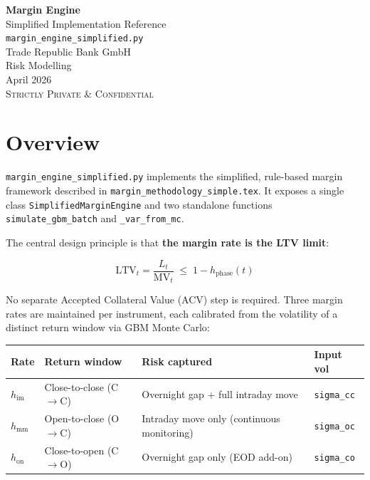\documentclass[9pt, a4paper]{extarticle}
\newenvironment{formulabox}{\par\addvspace{4pt}}{\par\addvspace{4pt}}
\begin{document}
\begin{titlepage}
\vspace*{4cm}
\begin{center}
    {\Huge\bfseries Margin Engine}\\[0.5em]
    {\Large Simplified Implementation Reference}\\[0.5em]
    {\normalsize \texttt{margin\_engine\_simplified.py}}\\[2em]
    {\large Trade Republic Bank GmbH}\\[0.5em]
    {\large Risk Modelling}\\[2em]
    {\normalsize April 2026}\\[1em]
    {\small\textsc{Strictly Private \& Confidential}}
\end{center}
\end{titlepage}

\tableofcontents
\newpage

\section{Overview}
\label{sec:overview}

\texttt{margin\_engine\_simplified.py} implements the simplified, rule-based margin
framework described in \texttt{margin\_methodology\_simple.tex}. It exposes a single
class \texttt{SimplifiedMarginEngine} and two standalone functions
\texttt{simulate\_gbm\_batch} and \texttt{\_var\_from\_mc}.

The central design principle is that \textbf{the margin rate is the LTV limit}:

\begin{formulabox}
\[
    \mathrm{LTV}_t = \frac{L_t}{\mathrm{MV}_t} \;\leq\; 1 - h_{\mathrm{phase}}(t)
\]
\end{formulabox}

No separate Accepted Collateral Value (ACV) step is required. Three margin rates
are maintained per instrument, each calibrated from the volatility of a distinct
return window via GBM Monte Carlo:

\begin{tabularx}{\linewidth}{llXl}
\toprule
\textbf{Rate} & \textbf{Return window} & \textbf{Risk captured} & \textbf{Input vol} \\
\midrule
$h_{\mathrm{im}}$ & Close-to-close (C$\to$C) & Overnight gap + full intraday move & \texttt{sigma\_cc} \\
$h_{\mathrm{mm}}$ & Open-to-close (O$\to$C)  & Intraday move only (continuous monitoring) & \texttt{sigma\_oc} \\
$h_{\mathrm{on}}$ & Close-to-open (C$\to$O)  & Overnight gap only (EOD add-on) & \texttt{sigma\_co} \\
\bottomrule
\end{tabularx}
\end{document}
